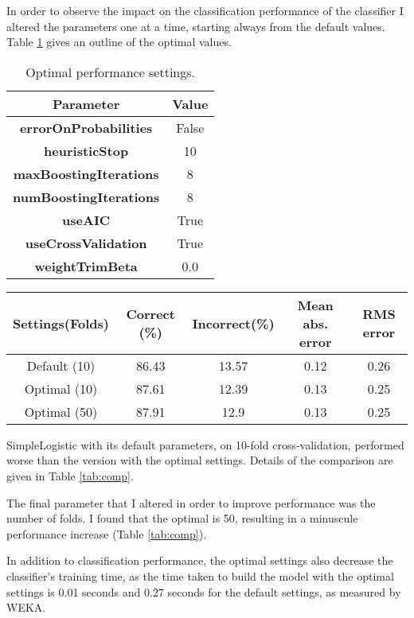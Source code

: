 \documentclass[12pt,twocolumn,a4paper]{article}
\begin{document}
In order to observe the impact on the classification performance of the classifier I altered the parameters one at a time, starting always from the default values. Table \ref{tab:opt} gives an outline of the optimal values. 

\begin{table}
\begin{tabular}{c | c }
\textbf{Parameter} & \textbf{Value} \\ \hline
\textbf{errorOnProbabilities} & False \\
\textbf{heuristicStop} & 10 \\
\textbf{maxBoostingIterations} & 8 \\
\textbf{numBoostingIterations} & 8 \\
\textbf{useAIC} & True \\
\textbf{useCrossValidation} & True \\
\textbf{weightTrimBeta} & 0.0 \\
\end{tabular}
\caption{Optimal performance settings.}
\label{tab:opt}
\end{table}

\begin{table*}
\centering
\begin{tabular}{c | c | c | c | c }
    \textbf{Settings(Folds)} & \textbf{Correct (\%)} & \textbf{Incorrect(\%)} & \textbf{Mean abs. error} & \textbf{RMS error} \\ \hline
    Default (10) & 86.43 & 13.57 & 0.12 & 0.26 \\
    Optimal (10) & 87.61 & 12.39 & 0.13 & 0.25 \\
    Optimal (50) & 87.91 & 12.9 & 0.13 & 0.25 \\
\end{tabular}
\caption{Comparison of classification performance of optimal vs. default settings for the SimpleLogistic classifier.}   
\label{tab:comp}
\end{table*}

SimpleLogistic with its default parameters, on 10-fold cross-validation, performed worse than the version with the optimal settings. Details of the comparison are given in Table \ref{tab:comp}.

The final parameter that I altered in order to improve performance was the number of folds. I found that the optimal is 50, resulting in a minuscule performance increase (Table \ref{tab:comp}).

In addition to classification performance, the optimal settings also decrease the classifier's training time, as the time taken to build the model with the optimal settings is 0.01 seconds and 0.27 seconds for the default settings, as measured by WEKA.
\end{document}
